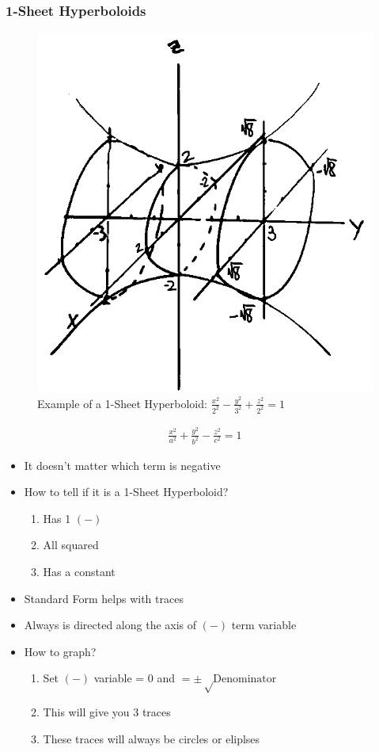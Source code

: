 \documentclass{article}
\begin{document}
\subsubsection{1-Sheet Hyperboloids}
\begin{figure}[h]
  \includegraphics[scale=0.5]{1-sheet-hyperboloid}
  \centering
  \caption{Example of a 1-Sheet Hyperboloid: $\frac{x^2}{2^2} - \frac{y^2}{3^2} + \frac{z^2}{2^2} = 1$}
  \label{fig:1-sheet-hyperboloid}
\end{figure}
\begin{align}
  \frac{x^2}{a^2} + \frac{y^2}{b^2} - \frac{z^2}{c^2} = 1
\end{align}
\begin{itemize}
  \item It doesn't matter which term is negative
  \item How to tell if it is a 1-Sheet Hyperboloid?
  \begin{enumerate}
    \item Has 1 $(-)$
    \item All squared
    \item Has a constant
  \end{enumerate}
  \item Standard Form helps with traces
  \item Always is directed along the axis of $(-)$ term variable
  \item How to graph?
  \begin{enumerate}
    \item Set $(-)$ variable = 0 and $= \pm\sqrt\textrm{Denominator}$
    \item This will give you 3 traces
    \item These traces will always be circles or eliplses
  \end{enumerate}
\end{itemize}
\end{document}
